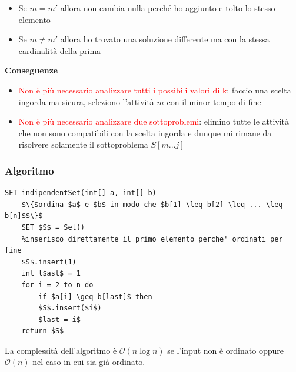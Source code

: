 \documentclass[../cheatSheetAlgoritmi.tex]{subfiles}
\begin{document}
\begin{itemize}
	\item Se $m = m'$ allora non cambia nulla perché ho aggiunto e tolto lo stesso elemento
	\item Se $m \neq m'$ allora ho trovato una soluzione differente ma con la stessa cardinalità della prima 
\end{itemize}
\textbf{Conseguenze}\\
\begin{itemize}
	\item \textcolor{red}{Non è più necessario analizzare tutti i possibili valori di k}: faccio una scelta ingorda ma sicura, seleziono l'attività $m$ con il minor tempo di fine
	\item \textcolor{red}{Non è più necessario analizzare due sottoproblemi}: elimino tutte le attività che non sono compatibili con la scelta ingorda e dunque mi rimane da risolvere solamente il sottoproblema $S[m...j]$
\end{itemize}
\subsubsection{Algoritmo}
\begin{lstlisting}[caption=indipendent Set (Greedy)]
SET indipendentSet(int[] a, int[] b)
	$\{$ordina $a$ e $b$ in modo che $b[1] \leq b[2] \leq ... \leq b[n]$$\}$
	SET $S$ = Set()
	%inserisco direttamente il primo elemento perche' ordinati per fine
	$S$.insert(1) 
	int l$ast$ = 1
	for i = 2 to n do
		if $a[i] \geq b[last]$ then
		$S$.insert($i$)
		$last = i$
	return $S$
\end{lstlisting}
La complessità dell'algoritmo è $\mathcal{O}(n\log{n})$ se l'input non è ordinato oppure $\mathcal{O}(n)$ nel caso in cui sia già ordinato.
\end{document}
